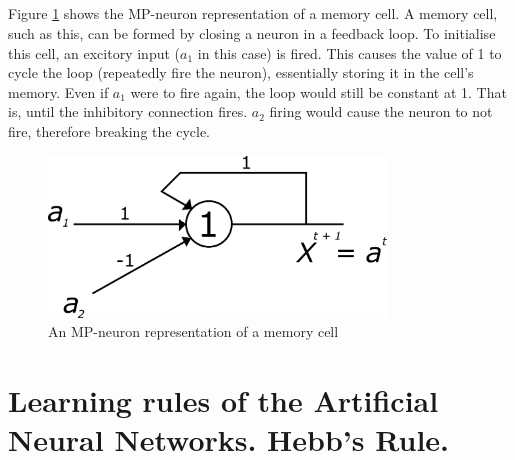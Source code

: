 \documentclass[a4paper]{report}
\begin{document}
\subsection{}
Figure \ref{fig:mem} shows the MP-neuron representation of a memory cell. A memory cell, such as this, can be formed by closing a neuron in a feedback loop. To initialise this cell, an excitory input (\(a_1\) in this case) is fired. This causes the value of 1 to cycle the loop (repeatedly fire the neuron), essentially storing it in the cell's memory. Even if \(a_1\) were to fire again, the loop would still be constant at 1. That is, until the inhibitory connection fires. \(a_2\) firing would cause the neuron to not fire, therefore breaking the cycle.
\begin{figure}[H]
    \centering
    \includegraphics[width=0.8\textwidth]{images/memory.png}
    \caption{An MP-neuron representation of a memory cell}
    \label{fig:mem}
\end{figure}

\section{Learning rules of the Artificial Neural Networks. Hebb’s Rule.}
\subsection{}

\renewcommand\bibname{References}


\end{document}

